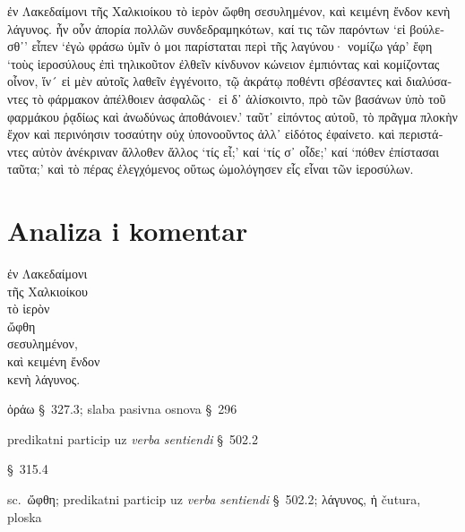 {\large

\begin{greek}

\noindent ἐν Λακεδαίμονι τῆς Χαλκιοίκου τὸ ἱερὸν ὤφθη σεσυλημένον, καὶ κειμένη ἔνδον κενὴ λάγυνος. ἦν οὖν ἀπορία πολλῶν συνδεδραμηκότων, καί τις τῶν παρόντων `εἰ βούλεσθ᾽' εἶπεν `ἐγὼ φράσω ὑμῖν ὁ μοι παρίσταται περὶ τῆς λαγύνου· νομίζω γάρ' ἔφη `τοὺς ἱεροσύλους ἐπὶ τηλικοῦτον ἐλθεῖν κίνδυνον κώνειον ἐμπιόντας καὶ κομίζοντας οἶνον, ἵν´ εἰ μὲν αὐτοῖς λαθεῖν ἐγγένοιτο, τῷ ἀκράτῳ ποθέντι σβέσαντες καὶ διαλύσαντες τὸ φάρμακον ἀπέλθοιεν ἀσφαλῶς· εἰ δ᾽ ἁλίσκοιντο, πρὸ τῶν βασάνων ὑπὸ τοῦ φαρμάκου ῥᾳδίως καὶ ἀνωδύνως ἀποθάνοιεν.' ταῦτ᾽ εἰπόντος αὐτοῦ, τὸ πρᾶγμα πλοκὴν ἔχον καὶ περινόησιν τοσαύτην οὐχ ὑπονοοῦντος ἀλλ᾽ εἰδότος ἐφαίνετο. καὶ περιστάντες αὐτὸν ἀνέκριναν ἄλλοθεν ἄλλος `τίς εἶ;' καί `τίς σ᾽ οἶδε;' καί `πόθεν ἐπίστασαι ταῦτα;' καὶ τὸ πέρας ἐλεγχόμενος οὕτως ὡμολόγησεν εἷς εἶναι τῶν ἱεροσύλων.

\end{greek}

}


\section*{Analiza i komentar}


{\large
\begin{greek}
\noindent ἐν Λακεδαίμονι \\
\tabto{2em} τῆς Χαλκιοίκου \\
τὸ ἱερὸν \\
ὤφθη \\
σεσυλημένον, \\
καὶ κειμένη ἔνδον \\
κενὴ λάγυνος.\\
 
\end{greek}
}

\begin{description}[noitemsep]
\item[ὤφθη] ὁράω §~327.3; slaba pasivna osnova §~296
\item[σεσυλημένον] predikatni particip uz \textit{verba sentiendi} §~502.2
\item[κειμένη] §~315.4
\item[κειμένη\dots\ κενὴ λάγυνος] sc.\ ὤφθη; predikatni particip uz \textit{verba sentiendi} §~502.2; λάγυνος, ἡ čutura, ploska
\end{description}



